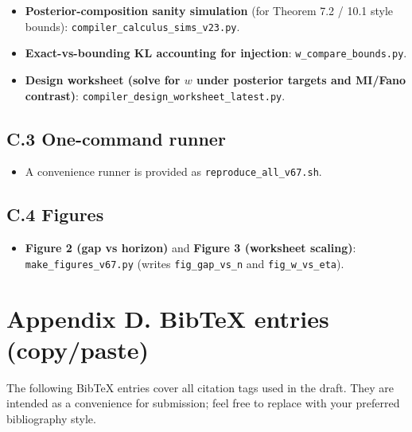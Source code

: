 \documentclass[11pt]{article}
\providecommand{\tightlist}{%
  \setlength{\itemsep}{0pt}\setlength{\parskip}{0pt}}
\begin{document}
\begin{itemize}
\tightlist
\item
  \textbf{Posterior-composition sanity simulation} (for Theorem 7.2 /
  10.1 style bounds): \texttt{compiler\_calculus\_sims\_v23.py}.
\item
  \textbf{Exact-vs-bounding KL accounting for injection}:
  \texttt{w\_compare\_bounds.py}.
\item
  \textbf{Design worksheet (solve for \(w\) under posterior targets and
  MI/Fano contrast)}: \texttt{compiler\_design\_worksheet\_latest.py}.
\end{itemize}

\hypertarget{c.3-one-command-runner}{%
\subsection{C.3 One-command runner}\label{c.3-one-command-runner}}

\begin{itemize}
\tightlist
\item
  A convenience runner is provided as \texttt{reproduce\_all\_v67.sh}.
\end{itemize}

\hypertarget{c.4-figures}{%
\subsection{C.4 Figures}\label{c.4-figures}}

\begin{itemize}
\tightlist
\item
  \textbf{Figure 2 (gap vs horizon)} and \textbf{Figure 3 (worksheet
  scaling)}: \texttt{make\_figures\_v67.py} (writes
  \texttt{fig\_gap\_vs\_n} and \texttt{fig\_w\_vs\_eta}).
\end{itemize}

\hypertarget{appendix-d.-bibtex-entries-copypaste}{%
\section{Appendix D. BibTeX entries
(copy/paste)}\label{appendix-d.-bibtex-entries-copypaste}}

The following BibTeX entries cover all citation tags used in the draft.
They are intended as a convenience for submission; feel free to replace
with your preferred bibliography style.
\end{document}
